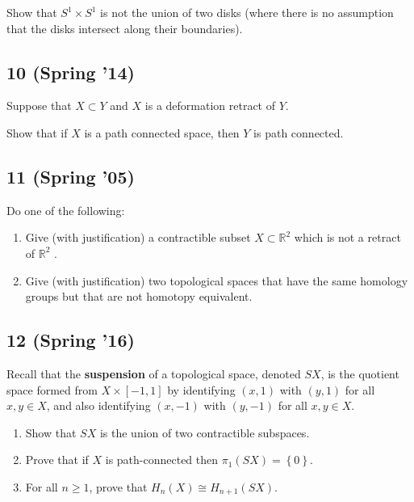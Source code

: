 Show that \(S^1 \times S^1\) is not the union of two disks (where there
is no assumption that the disks intersect along their boundaries).

\hypertarget{spring-14-4}{%
\subsection{10 (Spring '14)}\label{spring-14-4}}

Suppose that \(X \subset Y\) and \(X\) is a deformation retract of
\(Y\).

Show that if \(X\) is a path connected space, then \(Y\) is path
connected.

\hypertarget{spring-05-2}{%
\subsection{11 (Spring '05)}\label{spring-05-2}}

Do one of the following:

\begin{enumerate}
\def\labelenumi{\alph{enumi}.}
\item
  Give (with justification) a contractible subset
  \(X \subset {\mathbb{R}}^2\) which is not a retract of
  \({\mathbb{R}}^2\) .
\item
  Give (with justification) two topological spaces that have the same
  homology groups but that are not homotopy equivalent.
\end{enumerate}

\hypertarget{spring-16-4}{%
\subsection{12 (Spring '16)}\label{spring-16-4}}

Recall that the \textbf{suspension} of a topological space, denoted
\(SX\), is the quotient space formed from \(X \times [-1, 1]\) by
identifying \((x, 1)\) with \((y, 1)\) for all \(x, y \in X\), and also
identifying \((x, -1)\) with \((y, -1)\) for all \(x, y \in X\).

\begin{enumerate}
\def\labelenumi{\alph{enumi}.}
\item
  Show that \(SX\) is the union of two contractible subspaces.
\item
  Prove that if \(X\) is path-connected then
  \(\pi_1 (SX) = \left\{{0}\right\}\).
\item
  For all \(n \geq 1\), prove that \(H_{n} (X) \cong H_{n+1} (SX)\).
\end{enumerate}


